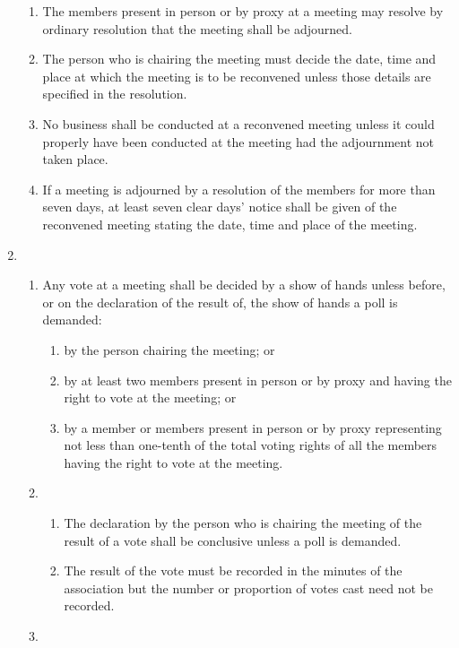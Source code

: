 \begin{enumerate}
  \begin{enumerate}
  \item
    The members present in person or by proxy at a meeting may resolve
    by ordinary resolution that the meeting shall be adjourned.
  \item
    The person who is chairing the meeting must decide the date, time
    and place at which the meeting is to be reconvened unless those
    details are specified in the resolution.
  \item
    No business shall be conducted at a reconvened meeting unless it
    could properly have been conducted at the meeting had the
    adjournment not taken place.
  \item
    If a meeting is adjourned by a resolution of the members for more
    than seven days, at least seven clear days' notice shall be given
    of the reconvened meeting stating the date, time and place of the
    meeting.
  \end{enumerate}
\item


  \begin{enumerate}
  \item
    Any vote at a meeting shall be decided by a show of hands unless
    before, or on the declaration of the result of, the show of hands a
    poll is demanded:
    \begin{enumerate}
    \item
      by the person chairing the meeting; or
    \item
      by at least two members present in person or by proxy and having
      the right to vote at the meeting; or
    \item
      by a member or members present in person or by proxy representing
      not less than one-tenth of the total voting rights of all the
      members having the right to vote at the meeting.
    \end{enumerate}
  \item


    \begin{enumerate}
    \item
      The declaration by the person who is chairing the meeting of the
      result of a vote shall be conclusive unless a poll is demanded.
    \item
      The result of the vote must be recorded in the minutes of the
      association but the number or proportion of votes cast need not be
      recorded.
    \end{enumerate}
  \item



\end{enumerate}
\end{enumerate}
